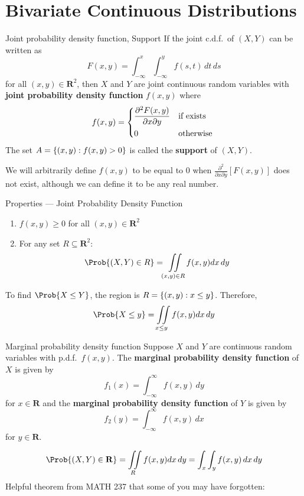 \section{Bivariate Continuous Distributions}
\begin{Definition}{Joint probability density function, Support}{}
    If the joint c.d.f.\ of $ (X,Y) $ can be written as
    \[ F(x,y)=\int_{-\infty}^{x} \int_{-\infty}^{y} f(s,t)\, d{t} \, d{s} \]
    for all $ (x,y)\in\mathbf{R}^2 $, then $ X $ and $ Y $
    are joint continuous random variables with \textbf{joint probability
        density function} $ f(x,y) $ where
    \[ f(x,y)=\begin{dcases*}
            \frac{\partial^2 F(x,y)}{\partial x\partial y} & if exists \\
            0                                              & otherwise
        \end{dcases*} \]
    The set $ A=\{(x,y):f(x,y)>0\} $ is called the \textbf{support} of $ (X,Y) $.
\end{Definition}
\begin{Remark}{}{}
    We will arbitrarily define $ f(x,y) $ to be equal to $ 0 $ when
    $ \displaystyle  \frac{\partial^2}{\partial x\partial y}[F(x,y)]
    $
    does not exist, although we can define it to be any real number.
\end{Remark}
\begin{Definition}{Properties --- Joint Probability Density Function}{}
    \begin{enumerate}[label=(\Roman*)]
        \item $ f(x,y)\ge 0 $ for all $ (x,y)\in\mathbf{R}^2 $
        \item For any set $ R\subseteq \mathbf{R}^2 $:
              \begin{align*}
                  \Prob{(X,Y)\in R}
                   & =\iint\limits_{(x,y)\in R}f(x,y)dx\,dy
              \end{align*}
    \end{enumerate}
\end{Definition}
\begin{Example}{}{}
    To find $ \Prob{X\le Y} $, the region is
    $ R=\{(x,y):x\le y\} $. Therefore,
    \[ \Prob{X\le y}=
        \iint\limits_{x\le y}f(x,y)dx\,dy \]
\end{Example}
\begin{Definition}{Marginal probability density function}{}
    Suppose $ X $ and $ Y $ are continuous random variables with
    p.d.f.\ $ f(x,y) $. The \textbf{marginal probability
        density function} of $ X $ is given by
    \[ f_1(x)=\int_{-\infty}^{\infty} f(x,y)\, d{y} \]
    for $ x\in\mathbf{R} $ and the \textbf{marginal probability
        density function} of $ Y $ is given by
    \[ f_2(y)=\int_{-\infty}^{\infty} f(x,y)\, d{x}  \]
    for $ y\in\mathbf{R} $.
\end{Definition}
\[ \Prob{(X,Y)\in\mathbf{R}}
    =\iint\limits_{R}f(x,y)dx\,dy=
    \int_{x} \int_{y}f(x,y) \, d{x} \, d{y} \]
Helpful theorem from MATH 237 that some of you may have forgotten:

